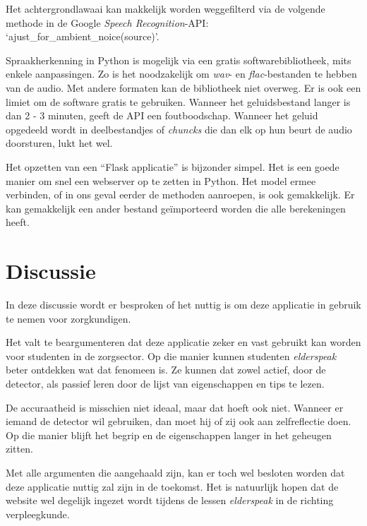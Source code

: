 Het achtergrondlawaai kan makkelijk worden weggefilterd via de volgende methode in de Google \textit{Speech Recognition}-API: `ajust\_for\_ambient\_noice(source)'.

Spraakherkenning in Python is mogelijk via een gratis softwarebibliotheek, mits enkele aanpassingen. Zo is het noodzakelijk om \textit{wav}- en \textit{flac}-bestanden te hebben van de audio. Met andere formaten kan de bibliotheek niet overweg. Er is ook een limiet om de software gratis te gebruiken. Wanneer het geluidsbestand langer is dan 2 - 3 minuten, geeft de API een foutboodschap. Wanneer het geluid opgedeeld wordt in deelbestandjes of \textit{chuncks} die dan elk op hun beurt de audio doorsturen, lukt het wel.

Het opzetten van een ``Flask applicatie'' is bijzonder simpel. Het is een goede manier om snel een webserver op te zetten in Python. Het model ermee verbinden, of in ons geval eerder de methoden aanroepen, is ook gemakkelijk. Er kan gemakkelijk een ander bestand geïmporteerd worden die alle berekeningen heeft.

\section{Discussie}
In deze discussie wordt er besproken of het nuttig is om deze applicatie in gebruik te nemen voor zorgkundigen.

Het valt te beargumenteren dat deze applicatie zeker en vast gebruikt kan worden voor studenten in de zorgsector. Op die manier kunnen studenten \textit{elderspeak} beter ontdekken wat dat fenomeen is. Ze kunnen dat zowel actief, door de detector, als passief leren door de lijst van eigenschappen en tips te lezen.

De accuraatheid is misschien niet ideaal, maar dat hoeft ook niet. Wanneer er iemand de detector wil gebruiken, dan moet hij of zij ook aan zelfreflectie doen. Op die manier blijft het begrip en de eigenschappen langer in het geheugen zitten.

Met alle argumenten die aangehaald zijn, kan er toch wel besloten worden dat deze applicatie nuttig zal zijn in de toekomst. Het is natuurlijk hopen dat de website wel degelijk ingezet wordt tijdens de lessen \textit{elderspeak} in de richting verpleegkunde.